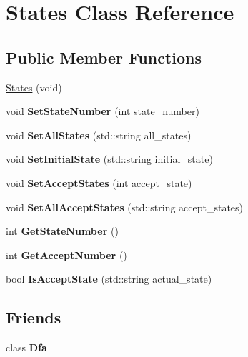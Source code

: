 \hypertarget{classStates}{}\section{States Class Reference}
\label{classStates}
\subsection*{Public Member Functions}
\begin{DoxyCompactItemize}
\item 
\hyperlink{classStates_a8cf0b9ef14edb0704c74ac62ea338eab}{States} (void)
\item 
\mbox{\label{classStates_a5a2bc9b7cc865d41d22d46f3171942c8}} 
void {\bfseries Set\+State\+Number} (int state\+\_\+number)
\item 
\mbox{\label{classStates_ac84bd2eaecd487ec1ec5f935810262bd}} 
void {\bfseries Set\+All\+States} (std\+::string all\+\_\+states)
\item 
\mbox{\label{classStates_a5a59b1d5e57a4a77053521c180259328}} 
void {\bfseries Set\+Initial\+State} (std\+::string initial\+\_\+state)
\item 
\mbox{\label{classStates_ac3038ae4bc800dd96e8f71186f3badbf}} 
void {\bfseries Set\+Accept\+States} (int accept\+\_\+state)
\item 
\mbox{\label{classStates_a69e75840154231517b78ef9e6fcedfc1}} 
void {\bfseries Set\+All\+Accept\+States} (std\+::string accept\+\_\+states)
\item 
\mbox{\label{classStates_a4e73e71b7f53665abbfd154b72f39d08}} 
int {\bfseries Get\+State\+Number} ()
\item 
\mbox{\label{classStates_a77328d7648bbe13bf6eada96850b444c}} 
int {\bfseries Get\+Accept\+Number} ()
\item 
\mbox{\label{classStates_a00c6a25604f801935f924ef5c89b3eda}} 
bool {\bfseries Is\+Accept\+State} (std\+::string actual\+\_\+state)
\end{DoxyCompactItemize}
\subsection*{Friends}
\begin{DoxyCompactItemize}
\item 
\mbox{\label{classStates_a21ab7f6ff9e8704242e18ecfde24a901}} 
class {\bfseries Dfa}
\end{DoxyCompactItemize}


